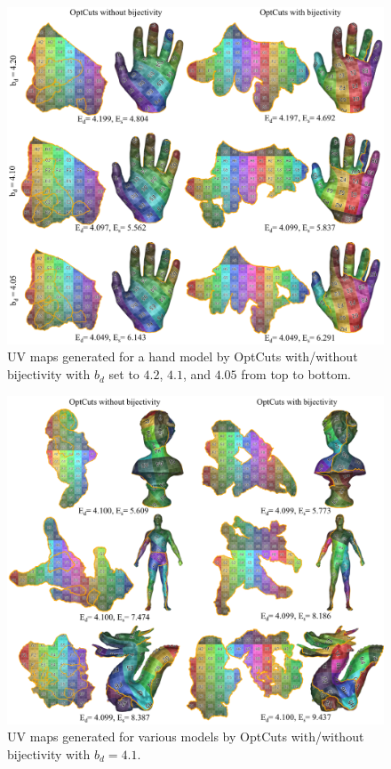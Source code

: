 \begin{figure}[!h]
\centering
\includegraphics[width=\linewidth]{fig/our_impressive_results_left.png}
\caption{UV maps generated for a hand model by OptCuts with/without bijectivity with $b_d$ set to $4.2$, $4.1$, and $4.05$ from top to bottom.}
\label{fig:our_impressive_results}
\end{figure}
\begin{figure}[!h]
\centering
\includegraphics[width=\linewidth]{fig/our_impressive_results_right.png}
\caption{UV maps generated for various models by OptCuts with/without bijectivity with $b_d = 4.1$.}
\label{fig:our_impressive_results}
\end{figure}


